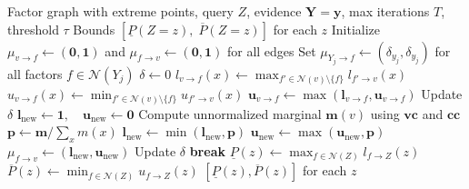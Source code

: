 \documentclass{article}
\begin{document}
\begin{algorithm}[H]
\caption{Interval Belief Propagation (IBP)}
\label{alg:ibp}
\begin{algorithmic}[1]
\Require Factor graph with extreme points, query $Z$, evidence $\mathbf{Y} = \mathbf{y}$,
         max iterations $T$, threshold $\tau$
\Ensure Bounds $[\underline{P}(Z{=}z),\; \overline{P}(Z{=}z)]$ for each $z$
\Statex
\State Initialize $\mu_{v \to f} \gets (\mathbf{0}, \mathbf{1})$ and
       $\mu_{f \to v} \gets (\mathbf{0}, \mathbf{1})$ for all edges
  \State Set $\mu_{Y_j \to f} \gets (\delta_{y_j}, \delta_{y_j})$ for all factors
         $f \in \mathcal{N}(Y_j)$
\EndFor
\Statex
{}
  \State $\delta \gets 0$
  \Statex
      \State $l_{v \to f}(x) \gets \max_{f' \in \mathcal{N}(v) \setminus \{f\}}
             l_{f' \to v}(x)$
      \State $u_{v \to f}(x) \gets \min_{f' \in \mathcal{N}(v) \setminus \{f\}}
             u_{f' \to v}(x)$
    \EndFor
    \State $\mathbf{u}_{v \to f} \gets \max(\mathbf{l}_{v \to f}, \mathbf{u}_{v \to f})$
    \State Update $\delta$
  \EndFor
  \Statex
    \State $\mathbf{l}_{\mathrm{new}} \gets \mathbf{1}, \quad \mathbf{u}_{\mathrm{new}} \gets \mathbf{0}$
        \State Compute unnormalized marginal $\mathbf{m}(v)$ using $\mathbf{vc}$ and $\mathbf{cc}$
        \State $\mathbf{p} \gets \mathbf{m} / \sum_{x} m(x)$
        \State $\mathbf{l}_{\mathrm{new}} \gets \min(\mathbf{l}_{\mathrm{new}}, \mathbf{p})$
        \State $\mathbf{u}_{\mathrm{new}} \gets \max(\mathbf{u}_{\mathrm{new}}, \mathbf{p})$
      \EndFor
    \EndFor
    \State $\mu_{f \to v} \gets (\mathbf{l}_{\mathrm{new}}, \mathbf{u}_{\mathrm{new}})$
    \State Update $\delta$
  \EndFor
  \If{$\delta < \tau$} \textbf{break} \EndIf
\EndFor
\Statex
{}
  \State $\underline{P}(z) \gets \max_{f \in \mathcal{N}(Z)} l_{f \to Z}(z)$
  \State $\overline{P}(z) \gets \min_{f \in \mathcal{N}(Z)} u_{f \to Z}(z)$
\EndFor
\State \Return $[\underline{P}(z), \overline{P}(z)]$ for each $z$
\end{algorithmic}
\end{algorithm}
\end{document}

